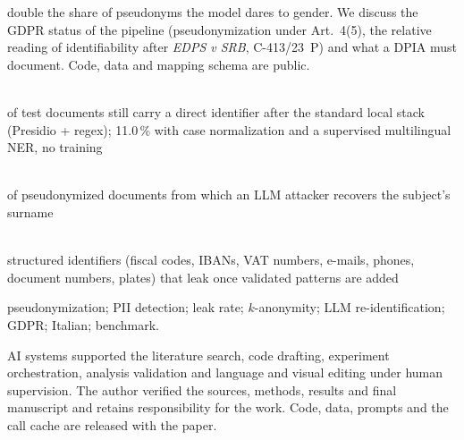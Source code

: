 \documentclass[11pt,a4paper]{article}
\newcommand{\keynumber}[3]{\begin{minipage}[t]{0.31\textwidth}\centering{\sffamily\bfseries\huge\color{#1}#2}\\[2pt]{\small #3}\end{minipage}}
\begin{document}
\begin{abstractbox}
double the share of pseudonyms the model dares to gender. We discuss the GDPR status of the pipeline (pseudonymization under Art.~4(5), the relative reading of identifiability after \emph{EDPS v SRB}, C-413/23~P) and what a DPIA must document. Code, data and mapping schema are public.
\end{abstractbox}

\vspace{0.6em}
\begin{numbersbox}
\keynumber{aigen}{41.2\,\%}{of test documents still carry a direct identifier after the standard local stack (Presidio + regex); 11.0\,\% with case normalization and a supervised multilingual NER, no training}\hfill
\keynumber{aigen}{35\,\%}{of pseudonymized documents from which an LLM attacker recovers the subject's surname}\hfill
\keynumber{accent}{0 / 1\,717}{structured identifiers (fiscal codes, IBANs, VAT numbers, e-mails, phones, document numbers, plates) that leak once validated patterns are added}
\end{numbersbox}

\vspace{0.5em}
 {\small pseudonymization; PII detection; leak rate; $k$-anonymity; LLM re-identification; GDPR; Italian; benchmark.}

\vspace{0.4em}
 {\scriptsize AI systems supported the literature search, code drafting, experiment orchestration, analysis validation and language and visual editing under human supervision. The author verified the sources, methods, results and final manuscript and retains responsibility for the work. Code, data, prompts and the call cache are released with the paper.}
\end{document}
